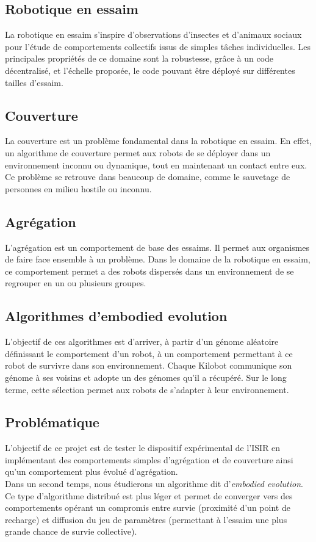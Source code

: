 \documentclass[a4paper]{article}
\begin{document}
\subsection{Robotique en essaim}
La robotique en essaim s'inspire d'observations d'insectes et d'animaux sociaux pour l'étude de comportements collectifs issus de simples tâches individuelles. Les principales propriétés de ce domaine sont la robustesse, grâce à un code décentralisé, et l'échelle proposée, le code pouvant être déployé sur différentes tailles d'essaim.
\subsection{Couverture}
La couverture est un problème fondamental dans la robotique en essaim. En effet, un algorithme de couverture permet aux robots de se déployer dans un environnement inconnu ou dynamique, tout en maintenant un contact entre eux. Ce problème se retrouve dans beaucoup de domaine, comme le sauvetage de personnes en milieu hostile ou inconnu.
\subsection{Agrégation}
L'agrégation est un comportement de base des essaims. Il permet aux organismes de faire face ensemble à un problème. Dans le domaine de la robotique en essaim, ce comportement permet a des robots dispersés dans un environnement de se regrouper en un ou plusieurs groupes.
\subsection{Algorithmes d'embodied evolution}
L'objectif de ces algorithmes est d'arriver, à partir d'un génome aléatoire définissant le comportement d'un robot, à un comportement permettant à ce robot de survivre dans son environnement. Chaque Kilobot communique son génome à ses voisins et adopte un des génomes qu'il a récupéré. Sur le long terme, cette sélection permet aux robots de s'adapter à leur environnement.
\subsection{Problématique}
L'objectif de ce projet est de tester le dispositif expérimental de  l'ISIR en implémentant des comportements simples d'agrégation et de couverture ainsi qu'un comportement plus évolué d'agrégation. \\Dans un second temps, nous étudierons un algorithme dit d'\textit{embodied evolution}. Ce type d'algorithme distribué est plus léger et permet de converger vers des comportements opérant un compromis entre survie (proximité d'un point de recharge) et diffusion du jeu de paramètres (permettant à l'essaim une plus grande chance de survie collective).
\newpage
\end{document}
